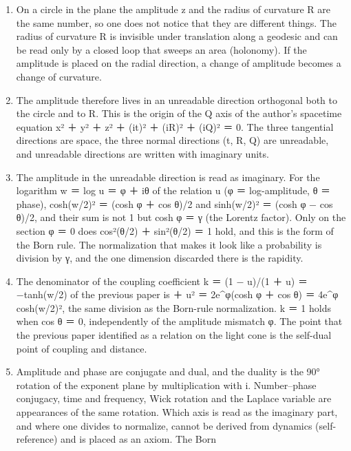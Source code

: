 \documentclass[
  a4paper,
]{article}
\providecommand{\tightlist}{%
  \setlength{\itemsep}{0pt}\setlength{\parskip}{0pt}}
\begin{document}
\begin{enumerate}
\def\labelenumi{\arabic{enumi}.}
\tightlist
\item
  On a circle in the plane the amplitude \textbar z\textbar{} and the
  radius of curvature R are the same number, so one does not notice that
  they are different things. The radius of curvature R is invisible
  under translation along a geodesic and can be read only by a closed
  loop that sweeps an area (holonomy). If the amplitude is placed on the
  radial direction, a change of amplitude becomes a change of curvature.
\item
  The amplitude therefore lives in an unreadable direction orthogonal
  both to the circle and to R. This is the origin of the Q axis of the
  author's spacetime equation x² ＋ y² ＋ z² ＋ (it)² ＋ (iR)² ＋ (iQ)²
  ＝ 0. The three tangential directions are space, the three normal
  directions (t, R, Q) are unreadable, and unreadable directions are
  written with imaginary units.
\item
  The amplitude in the unreadable direction is read as imaginary. For
  the logarithm w ＝ log u ＝ φ ＋ iθ of the relation u (φ ＝
  log-amplitude, θ ＝ phase), \textbar cosh(w/2)\textbar² ＝ (cosh φ ＋
  cos θ)/2 and \textbar sinh(w/2)\textbar² ＝ (cosh φ − cos θ)/2, and
  their sum is not 1 but cosh φ ＝ γ (the Lorentz factor). Only on the
  section φ ＝ 0 does cos²(θ/2) ＋ sin²(θ/2) ＝ 1 hold, and this is the
  form of the Born rule. The normalization that makes it look like a
  probability is division by γ, and the one dimension discarded there is
  the rapidity.
\item
  The denominator of the coupling coefficient k ＝ (1 − u)/(1 ＋ u) ＝
  −tanh(w/2) of the previous paper is  ＋ u\textbar² ＝
  2e\^{}φ(cosh φ ＋ cos θ) ＝ 4e\^{}φ \textbar cosh(w/2)\textbar², the
  same division as the Born-rule normalization. \textbar k\textbar{} ＝
  1 holds when cos θ ＝ 0, independently of the amplitude mismatch φ.
  The point that the previous paper identified as a relation on the
  light cone is the self-dual point of coupling and distance.
\item
  Amplitude and phase are conjugate and dual, and the duality is the 90°
  rotation of the exponent plane by multiplication with i. Number--phase
  conjugacy, time and frequency, Wick rotation and the Laplace variable
  are appearances of the same rotation. Which axis is read as the
  imaginary part, and where one divides to normalize, cannot be derived
  from dynamics (self-reference) and is placed as an axiom. The Born

\end{enumerate}
\end{document}
